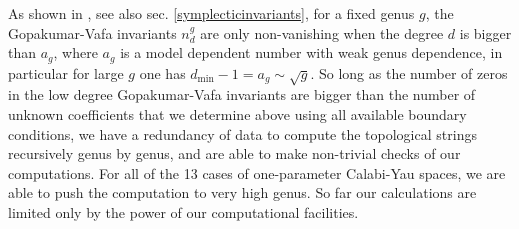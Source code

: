 \documentclass[12pt]{article}
\begin{document}
As shown in \cite{Katz:1999}, see also sec.
\ref{symplecticinvariants}, for a fixed genus $g$, the
Gopakumar-Vafa invariants $n^g_d$ are only non-vanishing when the
degree $d$ is bigger than $a_g$, where $a_g$ is a model dependent
number with weak genus dependence, in particular for large $g$ one
has $d_{\textrm{min}}-1 = a_g \sim \sqrt{g}$. So long as the
number of zeros in the low degree Gopakumar-Vafa invariants are
bigger than the number of unknown coefficients that we determine
above using all available boundary conditions, we have a
redundancy of data to compute the topological strings recursively
genus by genus, and are able to make non-trivial checks of our
computations. For all of the 13 cases of one-parameter Calabi-Yau
spaces, we are able to push the computation to very high genus. So
far our calculations are limited only by the power of our
computational facilities.
\end{document}
